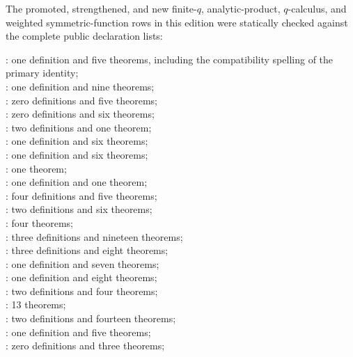 \documentclass[11pt,a4paper,oneside,openany]{book}
\theoremstyle{definition}
\theoremstyle{remark}
\begin{document}
The promoted, strengthened, and new finite-$q$, analytic-product,
$q$-calculus, and weighted symmetric-function rows in this edition were
statically checked against the complete public declaration lists:
\begin{center}
\small
{}: one definition and five theorems, including the
compatibility spelling of the primary identity;\\
: one definition and nine theorems;\\
: zero definitions and five theorems;\\
: zero definitions and six theorems;\\
: two definitions and one theorem;\\
: one definition and six theorems;\\
: one definition and six theorems;\\
: one theorem;\\
: one definition and one theorem;\\
: four definitions and five theorems;\\
: two definitions and six theorems;\\
: four theorems;\\
: three definitions and nineteen theorems;\\
: three definitions and eight theorems;\\
: one definition and seven theorems;\\
: one definition and eight theorems;\\
: two definitions and four theorems;\\
: 13 theorems;\\
: two definitions and fourteen theorems;\\
: one definition and five theorems;\\
: zero definitions and three theorems;\\

\end{center}
\end{document}
